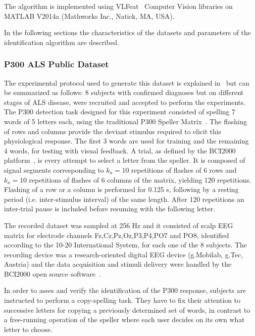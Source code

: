 \documentclass[utf8]{frontiersSCNS} %
\begin{document}
The algorithm is implemented using  VLFeat~\citep{Vedaldi2010} Computer Vision libraries on MATLAB V2014a (Mathworks Inc., Natick, MA, USA). 

In the following sections the characteristics of the datasets and parameters of the identification algorithm are described. 

\subsubsection{P300 ALS Public Dataset} \label{ALSDataset}

The experimental protocol used to generate this dataset is explained in~\citep{Riccio2013} but can be summarized as follows:  8 subjects with confirmed diagnoses but on different stages of ALS disease, were recruited and accepted to perform the experiments. The P300 detection task designed for this experiment consisted of spelling 7 words of 5 letters each, using the traditional P300 Speller Matrix~\citep{Farwell1988}. The flashing of rows and columns provide the deviant stimulus required to elicit this physiological response.  The first 3 words are used for training and the remaining 4 words, for testing with visual feedback.  A trial, as defined by the BCI2000 platform~\citep{Schalk2004}, is every attempt to select a letter from the speller. It is composed of signal segments corresponding to $k_a =10$ repetitions of flashes of 6 rows and $k_a =10$ repetitions of flashes of 6 columns of the matrix, yielding 120 repetitions.  Flashing of a row or a column is performed for 0.125 s, following by a resting period (i.e. inter-stimulus interval) of the same length.  After 120 repetitions an inter-trial pause is included before resuming with the following letter.

The recorded dataset was sampled at 256 Hz and it consisted of scalp EEG matrix for electrode channels Fz,Cz,Pz,Oz,P3,P4,PO7 and PO8, identified according to the 10-20 International System,  for each one of the 8 subjects.   The recording device was a research-oriented digital EEG device (g.Mobilab, g.Tec, Austria) and the data acquisition and stimuli delivery were handled by the BCI2000 open source software~\citep{Schalk2004}.

In order to asses and verify the identification of the P300 response, subjects are instructed to perform a copy-spelling task. They have to fix their attention to successive letters for copying a previously determined set of words, in contrast to a free-running operation of the speller where each user decides on its own what letter to choose.
\end{document}
